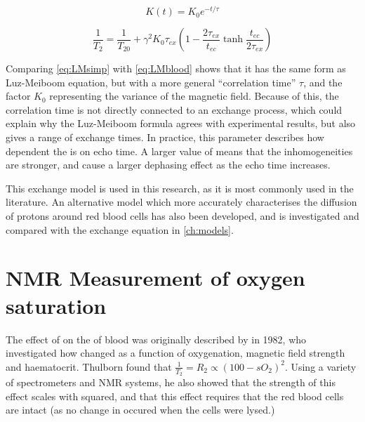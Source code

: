 \begin{equation}
K(t) = K_0 e^{-t/\tau}
\label{eq:JCExpCorr}
\end{equation}

\begin{equation}
\label{eq:LMsimp}
\frac{1}{T_2} = \frac{1}{T_{20}} + \gamma^2 K_0 \tau_{ex} (1 - \frac{2\tau_{ex}}{t_{ec}} \tanh{\frac{t_{ec}}{2\tau_{ex}}})
\end{equation}

Comparing \autoref{eq:LMsimp} with \autoref{eq:LMblood} shows that it has the same form as Luz-Meiboom equation, but with a more general ``correlation time'' $\tau$, and the factor $K_0$ representing the variance of the magnetic field.
Because of this, the correlation time is not directly connected to an exchange process, which could explain why the Luz-Meiboom formula agrees with experimental results, but also gives a range of exchange times.
In practice, this \Kzero parameter describes how dependent the \Ttwo is on echo time.
A larger value of \Kzero means that the inhomogeneities are stronger, and cause a larger dephasing effect as the echo time increases.

This exchange model is used in this research, as it is most commonly used in the literature.
An alternative model which more accurately characterises the diffusion of protons around red blood cells has also been developed\cite{JensenNMRrelaxationtissues2000}, and is investigated and compared with the exchange equation in \autoref{ch:models}.

\section{NMR Measurement of oxygen saturation}
The effect of \SOtwo on the \Ttwo of blood was originally described by \cite{ThulbornOxygenationdependencetransverse1982} in 1982, who investigated how \Ttwo changed as a function of oxygenation, magnetic field strength and haematocrit.
Thulborn found that $\frac{1}{T_2} = R_2 \propto (\mathit{100}-\mathit{sO_2})^2$.
Using a variety of spectrometers and NMR systems, he also showed that the strength of this effect scales with \Bzero squared, and that this effect requires that the red blood cells are intact (as no change in \Ttwo occured when the cells were lysed.)

